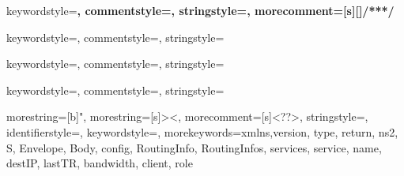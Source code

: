 





    {keywordstyle=\color{javakeyword}\bfseries,
    commentstyle=\color{javacomment},
    stringstyle=\color{javastring},
    morecomment=[s][\color{javacomment}]{/**}{*/}
}

  {keywordstyle=\color{pythonkeyword},      
  commentstyle=\color{pythoncomment},      
  stringstyle=\color{pythonstring}  
}

    {keywordstyle=\color{bashkeyword},
    commentstyle=\color{bashcomment},
    stringstyle=\color{bashstring}
}

    {keywordstyle=\color{c++keyword},
    commentstyle=\color{c++comment},
    stringstyle=\color{c++string}
}

{
  morestring=[b]",
  morestring=[s]{>}{<},
  morecomment=[s]{<?}{?>},
  stringstyle=\color{black},
  identifierstyle=\color{darkblue},
  keywordstyle=\color{cyan},
  morekeywords={xmlns,version, type, return, ns2, S, Envelope, Body, config, 
                RoutingInfo, RoutingInfos, services, service, name, destIP, 
                lastTR, bandwidth, client, role}%
}

